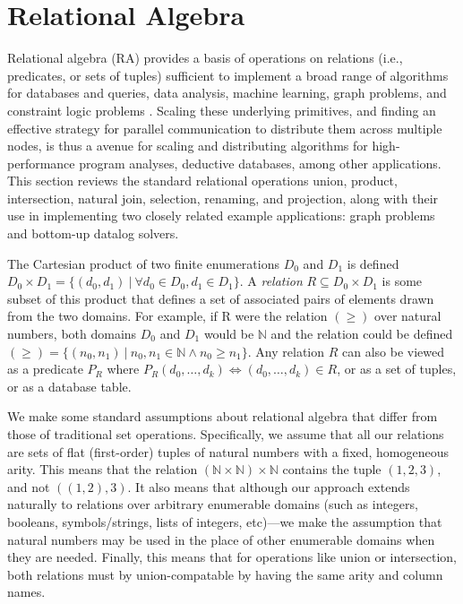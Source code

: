 

\section{Relational Algebra}
\label{sec:ra}
%
Relational algebra (RA) provides a basis of operations on relations (i.e., predicates, or sets of tuples) sufficient to implement a broad range of algorithms for databases and queries, data analysis, machine learning, graph problems, and constraint logic problems \cite{}. Scaling these underlying primitives, and finding an effective strategy for parallel communication to distribute them across multiple nodes, is thus a avenue for scaling and distributing algorithms for high-performance program analyses, deductive databases, among other applications. This section reviews the standard relational operations union, product, intersection, natural join, selection, renaming, and projection, along with their use in implementing two closely related example applications: graph problems and bottom-up datalog solvers.

The Cartesian product of two finite enumerations $D_0$ and $D_1$ is defined $D_0 \times D_1 = \{ (d_0, d_1) \ |\ \forall d_0 \in D_0, d_1 \in D_1 \}$. A \textit{relation} $R \subseteq D_0 \times D_1$ is some subset of this product that defines a set of associated pairs of elements drawn from the two domains. For example, if R were the relation $(\geq)$ over natural numbers, both domains $D_0$ and $D_1$ would be $\mathbb{N}$ and the relation could be defined $(\geq) = \{ (n_0, n_1) \ |\ n_0, n_1 \in \mathbb{N} \wedge n_0 \geq n_1 \}$. Any relation $R$ can also be viewed as a predicate $P_R$ where $P_R(d_0, \ldots, d_k) \iff (d_0, \ldots, d_k) \in R$, or as a set of tuples, or as a database table.

We make some standard assumptions about relational algebra that differ from those of traditional set operations. Specifically, we assume that all our relations are sets of flat (first-order) tuples of natural numbers with a fixed, homogeneous arity. This means that the relation $(\mathbb{N} \times \mathbb{N}) \times \mathbb{N}$ contains the tuple $(1,2,3)$, and not $((1,2),3)$. It also means that although our approach extends naturally to relations over arbitrary enumerable domains (such as integers, booleans, symbols/strings, lists of integers, etc)---we make the assumption that natural numbers may be used in the place of other enumerable domains when they are needed. Finally, this means that for operations like union or intersection, both relations must by union-compatable by having the same arity and column names.    

